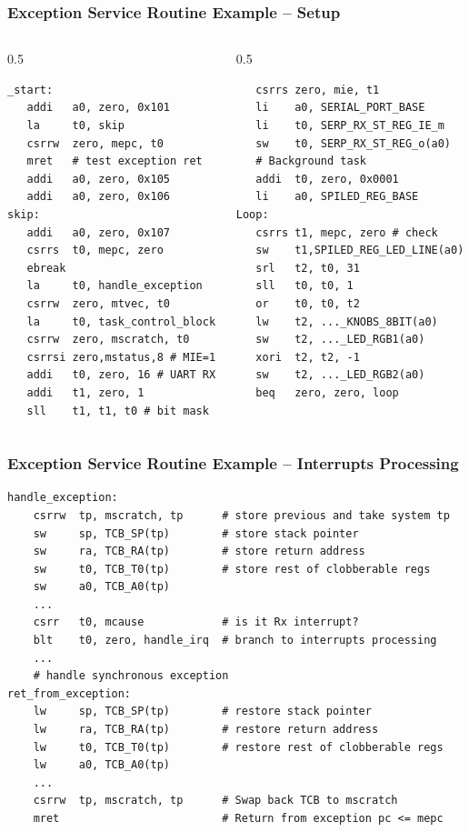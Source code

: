 \documentclass{beamer}
\begin{document}
\begin{frame}[fragile]
\frametitle{Exception Service Routine Example – Setup}

\begin{columns}
\begin{column}{0.5\textwidth}
\begin{verbatim}
_start:
   addi   a0, zero, 0x101
   la     t0, skip
   csrrw  zero, mepc, t0
   mret   # test exception ret
   addi   a0, zero, 0x105
   addi   a0, zero, 0x106
skip:
   addi   a0, zero, 0x107
   csrrs  t0, mepc, zero
   ebreak
   la     t0, handle_exception
   csrrw  zero, mtvec, t0
   la     t0, task_control_block
   csrrw  zero, mscratch, t0
   csrrsi zero,mstatus,8 # MIE=1
   addi   t0, zero, 16 # UART RX
   addi   t1, zero, 1
   sll    t1, t1, t0 # bit mask
\end{verbatim}
\end{column}
\begin{column}{0.5\textwidth}
\begin{verbatim}
   csrrs zero, mie, t1
   li    a0, SERIAL_PORT_BASE
   li    t0, SERP_RX_ST_REG_IE_m
   sw    t0, SERP_RX_ST_REG_o(a0)
   # Background task
   addi  t0, zero, 0x0001
   li    a0, SPILED_REG_BASE
Loop:
   csrrs t1, mepc, zero # check
   sw    t1,SPILED_REG_LED_LINE(a0)
   srl   t2, t0, 31
   sll   t0, t0, 1
   or    t0, t0, t2
   lw    t2, ..._KNOBS_8BIT(a0)
   sw    t2, ..._LED_RGB1(a0)
   xori  t2, t2, -1
   sw    t2, ..._LED_RGB2(a0)
   beq   zero, zero, loop
\end{verbatim}
\end{column}
\end{columns}

\end{frame}

\begin{frame}[fragile]
\frametitle{Exception Service Routine Example -- Interrupts Processing}

\begin{verbatim}
handle_exception:
    csrrw  tp, mscratch, tp      # store previous and take system tp
    sw     sp, TCB_SP(tp)        # store stack pointer
    sw     ra, TCB_RA(tp)        # store return address
    sw     t0, TCB_T0(tp)        # store rest of clobberable regs
    sw     a0, TCB_A0(tp)
    ...
    csrr   t0, mcause            # is it Rx interrupt?
    blt    t0, zero, handle_irq  # branch to interrupts processing
    ...
    # handle synchronous exception
ret_from_exception:
    lw     sp, TCB_SP(tp)        # restore stack pointer
    lw     ra, TCB_RA(tp)        # restore return address
    lw     t0, TCB_T0(tp)        # restore rest of clobberable regs
    lw     a0, TCB_A0(tp)
    ...
    csrrw  tp, mscratch, tp      # Swap back TCB to mscratch
    mret                         # Return from exception pc <= mepc
\end{verbatim}
\end{frame}
\end{document}
